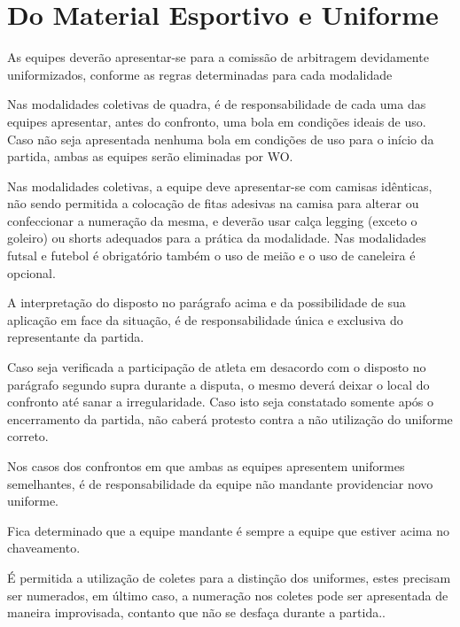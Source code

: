 {\let\clearpage\relax \chapter{Do Material Esportivo e Uniforme %
\label{chp:material}}}


\begin{article}
	As equipes deverão apresentar-se para a comissão de arbitragem devidamente uniformizados, conforme as regras determinadas para cada modalidade

	\begin{xparagraph}
		Nas modalidades coletivas de quadra, é de responsabilidade de cada uma das equipes apresentar, antes do confronto, uma bola em condições ideais de uso. Caso não seja apresentada nenhuma bola em condições de uso para o início da partida, ambas as equipes serão eliminadas por WO.
	\end{xparagraph}

	\begin{xparagraph}
		Nas modalidades coletivas, a equipe deve apresentar-se com camisas idênticas, não sendo permitida a colocação de fitas adesivas na camisa para alterar ou confeccionar a numeração da mesma, e deverão usar calça legging (exceto o goleiro) ou shorts adequados para a prática da modalidade. Nas modalidades futsal e futebol é obrigatório também o uso de meião e o uso de caneleira é opcional.
	\end{xparagraph}

	\begin{xparagraph}
		A interpretação do disposto no parágrafo acima e da possibilidade de sua aplicação em face da situação, é de responsabilidade única e exclusiva do representante da partida.
	\end{xparagraph}

	\begin{xparagraph}
		Caso seja verificada a participação de atleta em desacordo com o disposto no parágrafo segundo supra durante a disputa, o mesmo deverá deixar o local do confronto até sanar a irregularidade. Caso isto seja constatado somente após o encerramento da partida, não caberá protesto contra a não utilização do uniforme correto.
	\end{xparagraph}

	\begin{xparagraph}
		Nos casos dos confrontos em que ambas as equipes apresentem uniformes semelhantes, é de responsabilidade da equipe não mandante providenciar novo uniforme.
	\end{xparagraph}

	\begin{xparagraph}
		Fica determinado que a equipe mandante é sempre a equipe que estiver acima no chaveamento.
	\end{xparagraph}

	\begin{xparagraph}
		É permitida a utilização de coletes para a distinção dos uniformes, estes precisam ser numerados, em último caso, a numeração nos coletes pode ser apresentada de maneira improvisada, contanto que não se desfaça durante a partida..
	\end{xparagraph}
\end{article}
